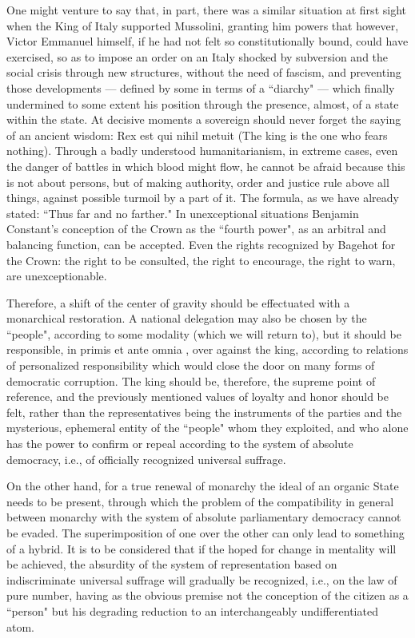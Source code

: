 One might venture to say that, in part, there was a similar situation at first sight when the King of Italy supported Mussolini, granting him powers that however, Victor Emmanuel himself, if he had not felt so constitutionally bound, could have exercised, so as to impose an order on an Italy shocked by subversion and the social crisis through new structures, without the need of fascism, and preventing those developments — defined by some in terms of a ``diarchy" — which finally undermined to some extent his position through the presence, almost, of a state within the state. At decisive moments a sovereign should never forget the saying of an ancient wisdom: Rex est qui nihil metuit (The king is the one who fears nothing). Through a badly understood humanitarianism, in extreme cases, even the danger of battles in which blood might flow, he cannot be afraid because this is not about persons, but of making authority, order and justice rule above all things, against possible turmoil by a part of it. The formula, as we have already stated: ``Thus far and no farther." In unexceptional situations Benjamin Constant's conception of the Crown as the ``fourth power", as an arbitral and balancing function, can be accepted. Even the rights recognized by Bagehot for the Crown: the right to be consulted, the right to encourage, the right to warn, are unexceptionable.

Therefore, a shift of the center of gravity should be effectuated with a monarchical restoration. A national delegation may also be chosen by the ``people", according to some modality (which we will return to), but it should be responsible, in primis et ante omnia , over against the king, according to relations of personalized responsibility which would close the door on many forms of democratic corruption. The king should be, therefore, the supreme point of reference, and the previously mentioned values of loyalty and honor should be felt, rather than the representatives being the instruments of the parties and the mysterious, ephemeral entity of the ``people" whom they exploited, and who alone has the power to confirm or repeal according to the system of absolute democracy, i.e., of officially recognized universal suffrage.

On the other hand, for a true renewal of monarchy the ideal of an organic State needs to be present, through which the problem of the compatibility in general between monarchy with the system of absolute parliamentary democracy cannot be evaded. The superimposition of one over the other can only lead to something of a hybrid. It is to be considered that if the hoped for change in mentality will be achieved, the absurdity of the system of representation based on indiscriminate universal suffrage will gradually be recognized, i.e., on the law of pure number, having as the obvious premise not the conception of the citizen as a ``person" but his degrading reduction to an interchangeably undifferentiated atom.

